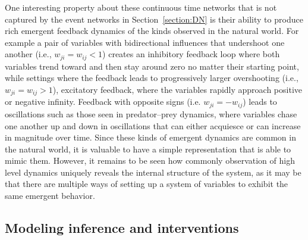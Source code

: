 \documentclass{cambridge7A}%
\newcommand{\ntodo}[2][]{\vspace{0.1cm} \hfil \todo[caption={\textbf{NB}}, size=\footnotesize, color = aliceblue, inline, #1]{#2}}
\begin{document}
One interesting property about these continuous time networks that is not captured by the event networks in Section~\ref{section:DN} is their ability to produce rich emergent feedback dynamics of the kinds observed in the natural world.  %
For example a pair of variables with bidirectional influences that undershoot one another (i.e., $w_{ji}=w_{ij}<1$) creates an inhibitory feedback loop where both variables trend toward and then stay around zero no matter their starting point, while settings where the feedback leads to progressively larger overshooting (i.e., $w_{ji}=w_{ij}>1$), excitatory feedback, where the variables rapidly approach positive or negative infinity.  %
Feedback with opposite signs (i.e. $w_{ji} = -w_{ij}$) leads to oscillations such as those seen in predator--prey dynamics, where variables chase one another up and down in oscillations that can either acquiesce or can increase in magnitude over time.  Since these kinds of emergent dynamics are common in the natural world, it is valuable to have a simple representation that is able to mimic them.  However, it remains to be seen how commonly observation of high level dynamics uniquely reveals the internal structure of the system, as it may be that there are multiple ways of setting up a system of variables to exhibit the same emergent behavior.%



\subsection{Modeling inference and interventions}
\end{document}
